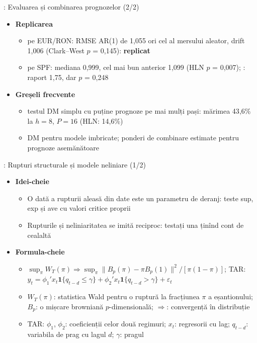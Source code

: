 \begin{frame}{: Evaluarea și combinarea prognozelor (2/2)}
\itemsize{\small}
\begin{itemize}
    \item \textbf{Replicarea}
    \begin{itemize}
        \item {} pe EUR/RON: RMSE AR(1) de 1{,}055 ori cel al mersului aleator, drift 1{,}006 (Clark--West $p$ = 0{,}145): \textbf{replicat}
        \item {} pe SPF: mediana 0{,}999, cel mai bun anterior 1{,}099 (HLN $p$ = 0{,}007); : raport 1{,}75, dar $p$ = 0{,}248
    \end{itemize}
    \item \textbf{Greșeli frecvente}
    \begin{itemize}
        \item testul DM simplu cu puține prognoze pe mai mulți pași: mărimea 43{,}6\% la $h = 8$, $P = 16$ (HLN: 14{,}6\%)
        \item DM pentru modele imbricate; ponderi de combinare estimate pentru prognoze asemănătoare
    \end{itemize}
\end{itemize}
\end{frame}

\begin{frame}{: Rupturi structurale și modele neliniare (1/2)}
\itemsize{\footnotesize}
\begin{itemize}
    \item \textbf{Idei-cheie}
    \begin{itemize}
        \item O dată a rupturii aleasă din date este un parametru de deranj: teste sup, exp și ave cu valori critice proprii
        \item Rupturile și neliniaritatea se imită reciproc: testați una ținînd cont de cealaltă
    \end{itemize}
    \item \textbf{Formula-cheie}
    \begin{itemize}
        \item $\sup_{\pi}W_T(\pi) \Rightarrow \sup_\pi \|B_p(\pi) - \pi B_p(1)\|^2/[\pi(1 - \pi)]$; TAR: $y_t = \phi_1'x_t\mathbf 1\{q_{t-d} \le \gamma\} + \phi_2'x_t\mathbf 1\{q_{t-d} > \gamma\} + \varepsilon_t$
        \item $W_T(\pi)$: statistica Wald pentru o ruptură la fracțiunea $\pi$ a eșantionului; $B_p$: o mișcare browniană $p$-dimensională; $\Rightarrow$: convergență în distribuție
        \item TAR: $\phi_1$, $\phi_2$: coeficienții celor două regimuri; $x_t$: regresorii cu lag; $q_{t-d}$: variabila de prag cu lagul $d$; $\gamma$: pragul
    \end{itemize}
\end{itemize}
\end{frame}


